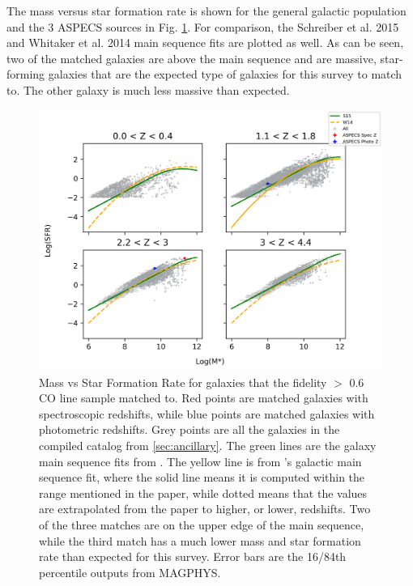 The mass versus star formation rate is shown for the general galactic population and the 3 ASPECS sources in Fig. \ref{fig:Cross_match}. For comparison, the Schreiber et al. 2015 \cite{schreiber2015herschel} and Whitaker et al. 2014 \cite{Whitaker_2014} main sequence fits are plotted as well. As can be seen, two of the matched galaxies are above the main sequence and are massive, star-forming galaxies that are the expected type of galaxies for this survey to match to. The other galaxy is much less massive than expected. 

\begin{figure}[!htbp]
\centering \includegraphics[width=120mm]{Survey/No_Cut_Mstar_vs_SFR_all_closest_sep_1_0_sn_fid_60.png}
\caption{Mass vs Star Formation Rate for galaxies that the fidelity $>$ 0.6 CO line sample matched to. Red points are matched galaxies with spectroscopic redshifts, while blue points are matched galaxies with photometric redshifts. Grey points are all the galaxies in the compiled catalog from \ref{sec:ancillary}. The green lines are the galaxy main sequence fits from \cite{schreiber2015herschel}. The yellow line is from \cite{Whitaker_2014}'s galactic main sequence fit, where the solid line means it is computed within the range mentioned in the paper, while dotted means that the values are extrapolated from the paper to higher, or lower, redshifts. Two of the three matches are on the upper edge of the main sequence, while the third match has a much lower mass and star formation rate than expected for this survey. Error bars are the 16/84th percentile outputs from MAGPHYS.}
\label{fig:Cross_match}
\end{figure}

